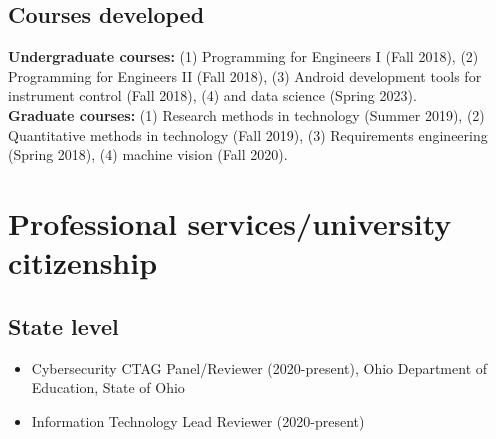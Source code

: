\documentclass{article}
\begin{document}
\vspace{-1em}
\subsection*{Courses developed}\vspace{-0.5em}
\begin{adjustwidth}{1cm}{}
\textbf{Undergraduate courses:} (1) Programming for Engineers I (Fall 2018), (2) Programming for Engineers II (Fall 2018), (3) Android development tools for instrument control (Fall 2018), (4) and data science (Spring 2023).\\
\textbf{Graduate courses:} (1) Research methods in technology (Summer 2019), (2) Quantitative methods in technology (Fall 2019), (3) Requirements engineering (Spring 2018), (4) machine vision (Fall 2020).
\end{adjustwidth}

\section*{Professional services/university citizenship}

\subsection*{State level}\vspace{-0.5em}
\begin{itemize}
\setlength\itemsep{-0.4em}
    \item Cybersecurity CTAG Panel/Reviewer (2020-present), Ohio Department of Education, State of Ohio
    \item Information Technology Lead Reviewer (2020-present)
\end{itemize}
\end{document}
